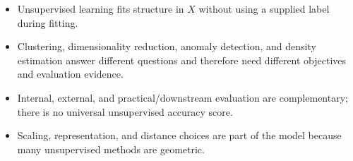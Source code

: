 \begin{chapterrecap}
\begin{itemize}
  \item Unsupervised learning fits structure in $X$ without using a supplied label during fitting.
  \item Clustering, dimensionality reduction, anomaly detection, and density estimation answer different questions and therefore need different objectives and evaluation evidence.
  \item Internal, external, and practical/downstream evaluation are complementary; there is no universal unsupervised accuracy score.
  \item Scaling, representation, and distance choices are part of the model because many unsupervised methods are geometric.
\end{itemize}
\end{chapterrecap}
